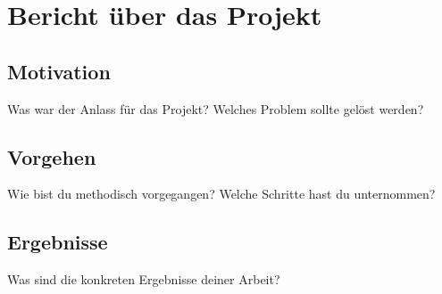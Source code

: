 
\section{Bericht über das Projekt}
\label{chap:projektbericht}

\subsection{Motivation}
\label{sec:motivation}
Was war der Anlass für das Projekt? Welches Problem sollte gelöst werden?

\subsection{Vorgehen}
\label{sec:vorgehen}
Wie bist du methodisch vorgegangen? Welche Schritte hast du unternommen?

\subsection{Ergebnisse}
\label{sec:ergebnisse}
Was sind die konkreten Ergebnisse deiner Arbeit?